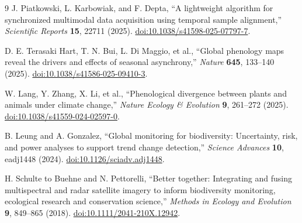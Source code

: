 \documentclass[10pt]{article}
\begin{document}
\begin{thebibliography}{9}
J. Piatkowski, L. Karbowiak, and F. Depta,
``A lightweight algorithm for synchronized multimodal data acquisition using
temporal sample alignment,'' \emph{Scientific Reports} \textbf{15}, 22711
(2025). \href{https://doi.org/10.1038/s41598-025-07797-7}{doi:10.1038/s41598-025-07797-7}.

D. E. Terasaki Hart, T. N. Bui, L. Di Maggio, et al.,
``Global phenology maps reveal the drivers and effects of seasonal asynchrony,''
\emph{Nature} \textbf{645}, 133--140 (2025).
\href{https://doi.org/10.1038/s41586-025-09410-3}{doi:10.1038/s41586-025-09410-3}.

W. Lang, Y. Zhang, X. Li, et al.,
``Phenological divergence between plants and animals under climate change,''
\emph{Nature Ecology \& Evolution} \textbf{9}, 261--272 (2025).
\href{https://doi.org/10.1038/s41559-024-02597-0}{doi:10.1038/s41559-024-02597-0}.

B. Leung and A. Gonzalez,
``Global monitoring for biodiversity: Uncertainty, risk, and power analyses to
support trend change detection,'' \emph{Science Advances} \textbf{10},
eadj1448 (2024).
\href{https://doi.org/10.1126/sciadv.adj1448}{doi:10.1126/sciadv.adj1448}.

H. Schulte to Buehne and N. Pettorelli,
``Better together: Integrating and fusing multispectral and radar satellite
imagery to inform biodiversity monitoring, ecological research and
conservation science,'' \emph{Methods in Ecology and Evolution} \textbf{9},
849--865 (2018).
\href{https://doi.org/10.1111/2041-210X.12942}{doi:10.1111/2041-210X.12942}.
\end{thebibliography}
\end{document}
